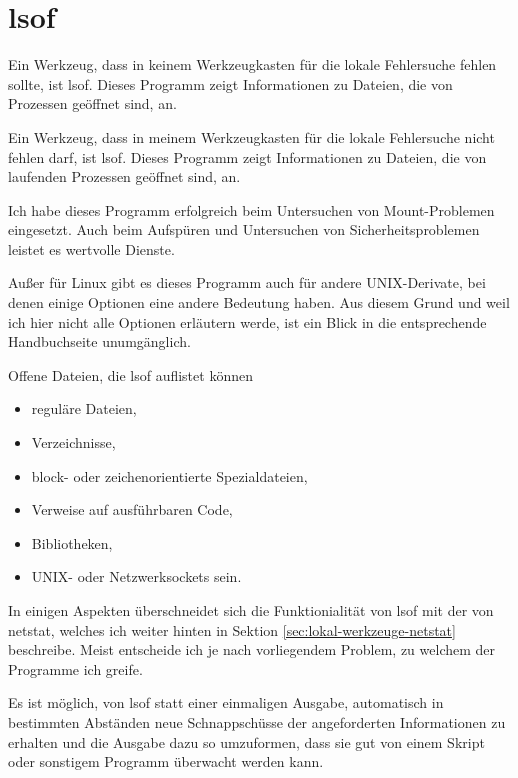 \section{lsof}
\label{sec:lokal-werkzeuge-lsof}
\begin{abstractsec}
  Ein Werkzeug, dass in keinem Werkzeugkasten für die lokale Fehlersuche fehlen
  sollte, ist lsof. Dieses Programm zeigt Informationen zu Dateien, die von
  Prozessen geöffnet sind, an.
\end{abstractsec}
\begin{normaltext}
  Ein Werkzeug, dass in meinem Werkzeugkasten für die lokale Fehlersuche nicht
  fehlen darf, ist lsof. Dieses Programm zeigt Informationen zu Dateien, die
  von laufenden Prozessen geöffnet sind, an.

  Ich habe dieses Programm erfolgreich beim Untersuchen von Mount-Problemen
  eingesetzt.
  Auch beim Aufspüren und Untersuchen von Sicherheitsproblemen leistet es
  wertvolle Dienste.

  Außer für Linux gibt es dieses Programm auch für andere UNIX-Derivate, bei
  denen einige Optionen eine andere Bedeutung haben. Aus diesem Grund und weil
  ich hier nicht alle Optionen erläutern werde, ist ein Blick in die
  entsprechende Handbuchseite unumgänglich.

  Offene Dateien, die lsof auflistet können
  \begin{itemize}
    \item reguläre Dateien,
    \item Verzeichnisse,
    \item block- oder zeichenorientierte Spezialdateien,
    \item Verweise auf ausführbaren Code,
    \item Bibliotheken,
    \item UNIX- oder Netzwerksockets sein.
  \end{itemize}

  In einigen Aspekten überschneidet sich die Funktionialität von lsof mit der
  von netstat, welches ich weiter hinten in 
  Sektion \ref{sec:lokal-werkzeuge-netstat}
  beschreibe. Meist entscheide ich je nach vorliegendem Problem, zu welchem
  der Programme ich greife.

  Es ist möglich, von lsof statt einer einmaligen Ausgabe, automatisch in
  bestimmten Abständen neue Schnappschüsse der angeforderten Informationen zu
  erhalten und die Ausgabe dazu so umzuformen, dass sie gut von einem Skript
  oder sonstigem Programm überwacht werden kann.


\end{normaltext}
